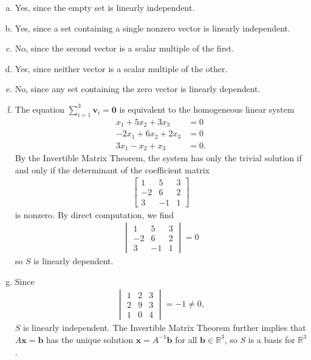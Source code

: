 \documentclass[12pt,letterpaper,reqno]{article}
\numberwithin{equation}{section}
\newcommand{\R}{\ensuremath{\mathbb R}}
\begin{document}
{\color{red}
\begin{solution}
\begin{enumerate}[(a)]
	\item Yes, since the empty set is linearly independent.
	\item Yes, since a set containing a single nonzero vector is linearly independent.
	\item No, since the second vector is a scalar multiple of the first.
	\item Yes, since neither vector is a scalar multiple of the other.
	\item No, since any set containing the zero vector is linearly dependent.
	\item The equation $\sum_{i=1}^3\mathbf{v}_i=\mathbf{0}$ is equivalent to the homogeneous linear system
	\begin{align*}
		x_1+5x_2+3x_3&=0 \\
		-2x_1+6x_2+2x_3&=0 \\
		3x_1-x_2+x_3&=0  .
	\end{align*}
	By the Invertible Matrix Theorem, the system has only the trivial solution if and only if the determinant of the coefficient matrix
	\begin{align*}
		\begin{bmatrix}
			1 & 5 & 3 \\
			-2 & 6 & 2 \\
			3 & -1 & 1
		\end{bmatrix}
	\end{align*}
	is nonzero. By direct computation, we find
	\begin{align*}
		\begin{vmatrix}
			1 & 5 & 3 \\
			-2 & 6 & 2 \\
			3 & -1 & 1
		\end{vmatrix}=0
	\end{align*} 
	so $S$ is linearly dependent.
	\item Since 
	\begin{align*}
		\begin{vmatrix}
			1 & 2 & 3 \\
			2 & 9 & 3 \\
			1 & 0 & 4
		\end{vmatrix}=-1 \neq 0,
	\end{align*}
	$S$ is linearly independent. The Invertible Matrix Theorem further implies that $A\mathbf{x}=\mathbf{b}$ has the unique solution $\mathbf{x}=A^{-1}\mathbf{b}$ for all $\mathbf{b} \in \R^3$, so $S$ is a basis for $\R^3$.

\end{enumerate}
\end{solution}}
\end{document}
